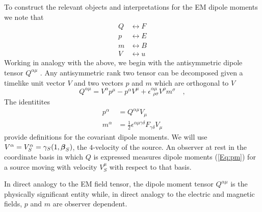 To construct the relevant objects and interpretations for the EM
dipole moments we note that
\begin{align}
Q & \leftrightarrow F \nonumber \\
p & \leftrightarrow E \nonumber \\
m & \leftrightarrow B \nonumber \\
V & \leftrightarrow u 
\end{align}
Working in analogy with the above, we begin with the
antisymmetric dipole tensor $Q^{\alpha\mu}$ . Any antisymmetric rank two tensor can be
decomposed given a timelike unit vector $V$ and two vectors $p$ and $m$
which are orthogonal to $V$
\begin{equation}
Q^{\alpha \mu}=V^\alpha p^\mu-p^\alpha V^\mu +\epsilon^{\alpha
  \mu}_{\ \ \rho \sigma}V^\rho m^\sigma \quad ,
\end{equation}
The identitites
\begin{align}
p^\alpha & = Q^{\alpha \mu} V_\mu \nonumber \\
m^\alpha & = \frac{1}{2} \epsilon^{\alpha \mu \gamma \delta} F_{\gamma
  \delta} V_{\mu}
\label{Eq:pm}
\end{align}
provide definitions for the covariant dipole
moments. We will use $V^\alpha = V^\alpha_S = \gamma_S(1,{\boldsymbol \beta}_S)$, the
$4$-velocity of the source.
An observer at rest in the coordinate basis in which $Q$ is expressed
measures dipole moments (\ref{Eq:pm}) for a source moving with velocity
$V_S^\mu$ with respect to that basis.


In direct analogy to the EM field tensor, the dipole moment tensor
$Q^{\alpha \mu}$
is the physically significant entity while, in direct analogy to
the electric and magnetic fields, $p$ and $m$ are observer dependent. 

